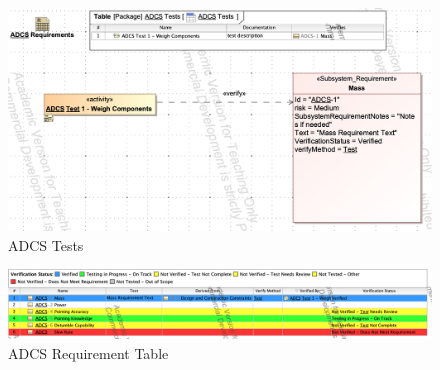 \documentclass[conference]{joss-pretty}
\begin{document}
\begin{figure}
    \centering
    \includegraphics[width=\textwidth]{Figures/ADCS tests.png}
    \caption{ADCS Tests}
    \label{fig:ADCS Tests}
\end{figure}

\begin{figure}
    \centering
    \includegraphics[width=\textwidth]{Figures/ADCS requirement table.png}
    \caption{ADCS Requirement Table}
    \label{fig:ADCS Requirement Table}
\end{figure}
\end{document}
